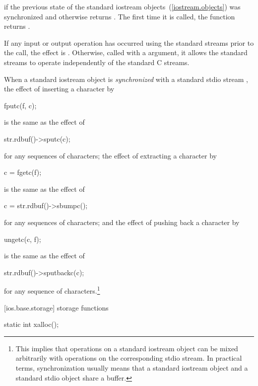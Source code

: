 \begin{itemdescr}
\pnum
\returns
{}
if the previous state of the standard iostream objects~(\ref{iostream.objects})
was synchronized and otherwise returns
.
The first time it is called,
the function returns
.

\pnum
\effects
If any input or output operation has occurred using the standard streams prior to the
call, the effect is
.
Otherwise, called with a  argument, it allows the standard streams to
operate independently of the standard C streams.

\pnum
When a standard iostream object  is
\textit{synchronized}
with a standard stdio stream , the effect of inserting a character  by
\begin{codeblock}
fputc(f, c);
\end{codeblock}
is the same as the effect of
\begin{codeblock}
str.rdbuf()->sputc(c);
\end{codeblock}
for any sequences of characters; the effect of extracting a character  by
\begin{codeblock}
c = fgetc(f);
\end{codeblock}
is the same as the effect of
\begin{codeblock}
c = str.rdbuf()->sbumpc();
\end{codeblock}
for any sequences of characters; and the effect of pushing back a character  by
\begin{codeblock}
ungetc(c, f);
\end{codeblock}
is the same as the effect of
\begin{codeblock}
str.rdbuf()->sputbackc(c);
\end{codeblock}
for any sequence of characters.\footnote{This implies that operations on a standard iostream object can be mixed arbitrarily
with operations on the corresponding stdio stream. In practical terms, synchronization
usually means that a standard iostream object and a standard stdio object share a
buffer.
}
\end{itemdescr}

[ios.base.storage]{ storage functions}

%
\begin{itemdecl}
static int xalloc();
\end{itemdecl}

